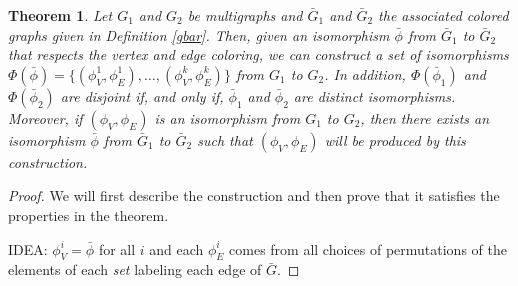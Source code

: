 \documentclass[amsmath,secnumarabic,floatfix,amssymb,nofootinbib,nobibnotes,letterpaper,11pt,tightenlines,showkeys]{revtex4}
\newtheorem{theorem}{Theorem}
\theoremstyle{definition}
\newtheorem{definition}[theorem]{Definition}
\let\mgp=\marginpar \marginparwidth18mm \marginparsep1mm
\def\marginpar#1{\mgp{\raggedright\tiny #1}}
\let\lbl=\label
\def\label#1{\lbl{#1}\ifinner\else\marginpar{\ref{#1} #1}\ignorespaces\fi}
\begin{document}

%	
%

\begin{theorem}
	Let $G_1$ and $G_2$ be multigraphs and $\bar{G}_1$ and $\bar{G}_2$ the associated colored graphs given in Definition \ref{gbar}. Then, given an isomorphism $\bar{\phi}$ from $\bar{G}_1$ to $\bar{G}_2$ that respects the vertex and edge coloring, we can construct a set of isomorphisms $\Phi(\bar{\phi}) = \{(\phi^1_V,\phi^1_E),\ldots,(\phi^k_V,\phi^k_E)\}$ from $G_1$ to $G_2$. In addition, $\Phi(\bar{\phi}_1)$ and $\Phi(\bar{\phi}_2) $ are disjoint if, and only if, $\bar{\phi}_1$ and $\bar{\phi}_2$ are distinct isomorphisms. Moreover, if $(\phi_V,\phi_E)$ is an isomorphism from $G_1$ to $G_2$, then there exists an isomorphism $\bar{\phi}$ from $\bar{G}_1$ to $\bar{G}_2$ such that $(\phi_V,\phi_E)$ will be produced by this construction. 
\end{theorem}

\begin{proof}
	We will first describe the construction and then prove that it satisfies the properties in the theorem.

	IDEA: $\phi^i_V = \bar{\phi}$ for all $i$ and each $\phi^i_E$ comes from all choices of permutations of the elements of each \emph{set} labeling each edge of $\bar{G}$.
\end{proof}


\end{document}
